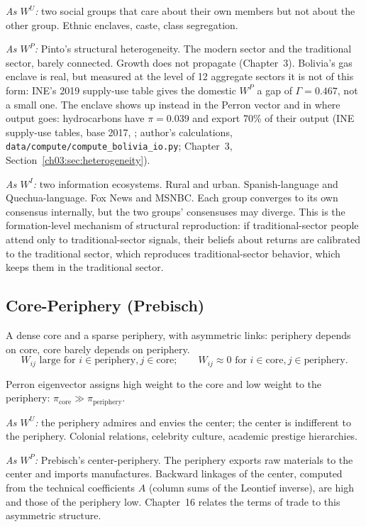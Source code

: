 \documentclass[../structural_economics_book.tex]{subfiles}
\begin{document}
\textit{As $W^U$:} two social groups that care about their own members but not about the other group. Ethnic enclaves, caste, class segregation.

\textit{As $W^P$:} Pinto's structural heterogeneity. The modern sector and the traditional sector, barely connected. Growth does not propagate (Chapter~3). Bolivia's gas enclave is real, but measured at the level of 12 aggregate sectors it is not of this form: INE's 2019 supply-use table gives the domestic $W^P$ a gap of $\Gamma = 0.467$, not a small one. The enclave shows up instead in the Perron vector and in where output goes: hydrocarbons have $\pi = 0.039$ and export 70\% of their output (INE supply-use tables, base 2017, \citealp{ine2026sut}; author's calculations, \texttt{data/compute/compute\_bolivia\_io.py}; Chapter~3, Section~\ref{ch03:sec:heterogeneity}).

\textit{As $W^I$:} two information ecosystems. Rural and urban. Spanish-language and Quechua-language. Fox News and MSNBC. Each group converges to its own consensus internally, but the two groups' consensuses may diverge. This is the formation-level mechanism of structural reproduction: if traditional-sector people attend only to traditional-sector signals, their beliefs about returns are calibrated to the traditional sector, which reproduces traditional-sector behavior, which keeps them in the traditional sector.


\subsection{Core-Periphery (Prebisch)}

A dense core and a sparse periphery, with asymmetric links: periphery depends on core, core barely depends on periphery.
\begin{equation}
W_{ij} \text{ large for } i \in \text{periphery}, j \in \text{core}; \qquad W_{ij} \approx 0 \text{ for } i \in \text{core}, j \in \text{periphery}.
\end{equation}

Perron eigenvector assigns high weight to the core and low weight to the periphery: $\pi_{\text{core}} \gg \pi_{\text{periphery}}$.

\textit{As $W^U$:} the periphery admires and envies the center; the center is indifferent to the periphery. Colonial relations, celebrity culture, academic prestige hierarchies.

\textit{As $W^P$:} Prebisch's center-periphery. The periphery exports raw materials to the center and imports manufactures. Backward linkages of the center, computed from the technical coefficients $A$ (column sums of the Leontief inverse), are high and those of the periphery low. Chapter~16 relates the terms of trade to this asymmetric structure.
\end{document}

